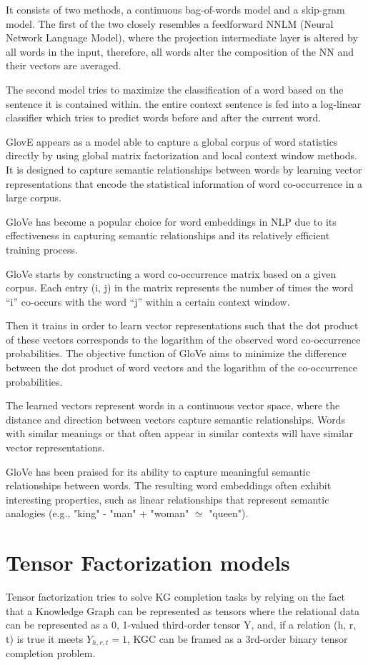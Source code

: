 It consists of two methods, a continuous bag-of-words model and a skip-gram model. The first of the two closely resembles a feedforward NNLM (Neural Network Language Model), where the projection intermediate layer is altered by all words in the input, therefore, all words alter the composition of the NN and their vectors are averaged.

The second model tries to maximize the classification of a word based on the sentence it is contained within. the entire context sentence is fed into a log-linear classifier which tries to predict words before and after the current word.

GlovE \cite{} appears as a model able to capture a global corpus of word statistics directly by using global matrix factorization and local context window methods. It is designed to capture semantic relationships between words by learning vector representations that encode the statistical information of word co-occurrence in a large corpus.

GloVe has become a popular choice for word embeddings in NLP due to its effectiveness in capturing semantic relationships and its relatively efficient training process.

GloVe starts by constructing a word co-occurrence matrix based on a given corpus. Each entry (i, j) in the matrix represents the number of times the word ``i'' co-occurs with the word ``j'' within a certain context window.

Then it trains in order to learn vector representations such that the dot product of these vectors corresponds to the logarithm of the observed word co-occurrence probabilities. The objective function of GloVe aims to minimize the difference between the dot product of word vectors and the logarithm of the co-occurrence probabilities.

The learned vectors represent words in a continuous vector space, where the distance and direction between vectors capture semantic relationships. Words with similar meanings or that often appear in similar contexts will have similar vector representations.

GloVe has been praised for its ability to capture meaningful semantic relationships between words. The resulting word embeddings often exhibit interesting properties, such as linear relationships that represent semantic analogies (e.g., "king" - "man" + "woman" $\simeq$ "queen").


\section{Tensor Factorization models}\label{sec:emb-tensor}
Tensor factorization tries to solve KG completion tasks by relying on the fact that a Knowledge Graph can be represented as tensors where the relational data can be represented as a {0, 1}-valued third-order tensor Y, and, if a relation (h, r, t) is true it meets $Y_{h,r,t} = 1$, KGC can be framed as a 3rd-order binary tensor completion problem.

